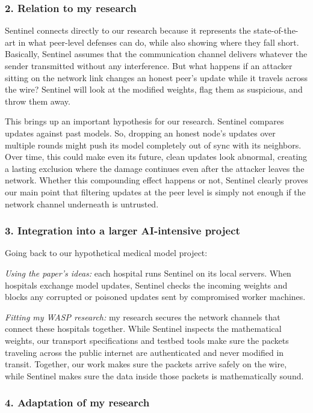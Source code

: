 \documentclass[11pt,a4paper]{article}
\begin{document}
\subsubsection*{2. Relation to my research}

Sentinel connects directly to our research because it represents the state-of-the-art in what peer-level defenses can do, while also showing where they fall short. Basically, Sentinel assumes that the communication channel delivers whatever the sender transmitted without any interference. But what happens if an attacker sitting on the network link changes an honest peer's update while it travels across the wire? Sentinel will look at the modified weights, flag them as suspicious, and throw them away.

This brings up an important hypothesis for our research. Sentinel compares updates against past models. So, dropping an honest node's updates over multiple rounds might push its model completely out of sync with its neighbors. Over time, this could make even its future, clean updates look abnormal, creating a lasting exclusion where the damage continues even after the attacker leaves the network. Whether this compounding effect happens or not, Sentinel clearly proves our main point that filtering updates at the peer level is simply not enough if the network channel underneath is untrusted.

\subsubsection*{3. Integration into a larger AI-intensive project}

Going back to our hypothetical medical model project:

\emph{Using the paper's ideas:} each hospital runs Sentinel on its local servers. When hospitals exchange model updates, Sentinel checks the incoming weights and blocks any corrupted or poisoned updates sent by compromised worker machines.

\emph{Fitting my WASP research:} my research secures the network channels that connect these hospitals together. While Sentinel inspects the mathematical weights, our transport specifications and testbed tools make sure the packets traveling across the public internet are authenticated and never modified in transit. Together, our work makes sure the packets arrive safely on the wire, while Sentinel makes sure the data inside those packets is mathematically sound.

\subsubsection*{4. Adaptation of my research}
\end{document}
